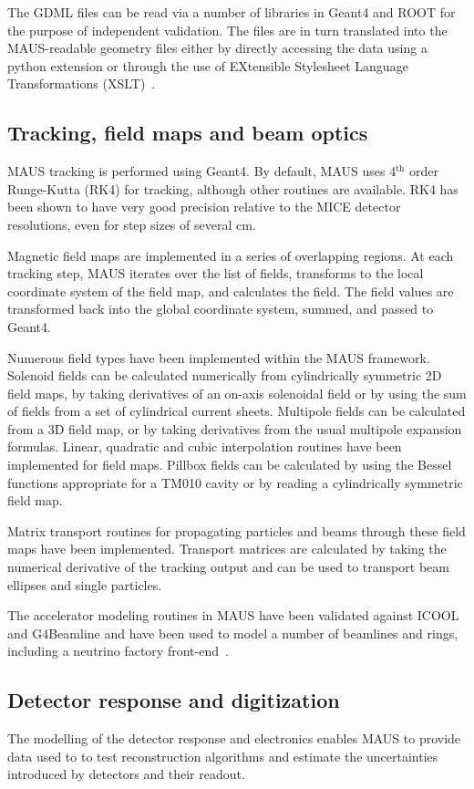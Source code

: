 \documentclass[11pt]{article}
\begin{document}
The GDML files can be read via a
number of  libraries in Geant4 and ROOT for the
purpose of independent validation. The files are in turn translated into the MAUS-readable
geometry files either by directly accessing the data using a python
extension or through the use of EXtensible Stylesheet Language Transformations
(XSLT)~\cite{xslt}.

\subsection{Tracking, field maps and beam optics}\label{sec:fieldoptics}
MAUS tracking is performed using Geant4. By default, MAUS uses 4$^\mathrm{th}$ order Runge-Kutta (RK4) for tracking, although other routines are available. RK4 has been shown to have very good precision relative to the MICE detector resolutions, even for step sizes of several cm.

Magnetic field maps are implemented in a series of overlapping regions. At each tracking step, MAUS iterates over the list of fields, transforms to the local coordinate system of the field map, and calculates the field. The field values are transformed back into the global coordinate system, summed, and passed to Geant4. 

Numerous field types have been implemented within the MAUS framework. Solenoid fields can be calculated numerically from cylindrically symmetric 2D field maps, by taking derivatives of an on-axis solenoidal field or by using the sum of fields from a set of cylindrical current sheets. Multipole fields can be calculated from a 3D field map, or by taking derivatives from the usual multipole expansion formulas. Linear, quadratic and cubic interpolation routines have been implemented for field maps. Pillbox fields can be calculated by using the Bessel functions appropriate for a TM010 cavity or by reading a cylindrically symmetric field map.

Matrix transport routines for propagating particles and beams through these field maps have been implemented. Transport matrices are calculated by taking the numerical derivative of the tracking output and can be used to transport beam ellipses and single particles.

The accelerator modeling routines in MAUS have been validated against ICOOL and G4Beamline and have been used to model a number of beamlines and rings, including a neutrino factory front-end~\cite{MAUSNuFact}.

\subsection{Detector response and digitization}\label{sec:detresp}
The modelling of the detector response and electronics enables MAUS to provide  data used to to test reconstruction algorithms and estimate the uncertainties introduced by detectors and their readout.
\end{document}
